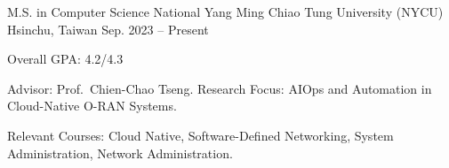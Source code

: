 

\begin{cventries}

  \cventry
    {M.S. in Computer Science} %
    {National Yang Ming Chiao Tung University (NYCU)} %
    {Hsinchu, Taiwan} %
    {Sep. 2023 -- Present} %
    {
      \begin{cvitems} %
        \item {Overall GPA: 4.2/4.3}
        \item {Advisor: Prof.~Chien-Chao Tseng. Research Focus: AIOps and Automation in Cloud-Native O-RAN Systems.}
        \item {Relevant Courses: Cloud Native, Software-Defined Networking, System Administration, Network Administration.}
      \end{cvitems}
    }

\end{cventries}

